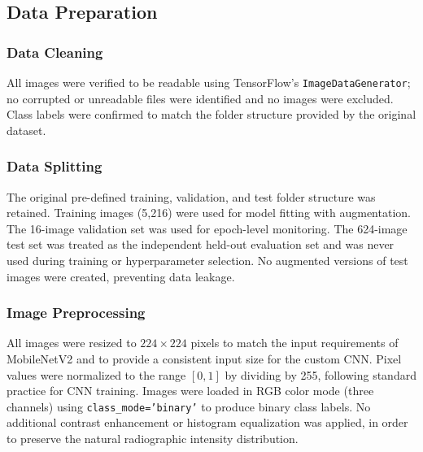 \documentclass[preprint,12pt]{elsarticle}
\begin{document}
\subsection{Data Preparation}

\subsubsection{Data Cleaning}
All images were verified to be readable using TensorFlow's
\texttt{ImageDataGenerator}; no corrupted or unreadable files were
identified and no images were excluded.
Class labels were confirmed to match the folder structure provided by
the original dataset.

\subsubsection{Data Splitting}
The original pre-defined training, validation, and test folder
structure was retained.
Training images (5{,}216) were used for model fitting with
augmentation.
The 16-image validation set was used for epoch-level monitoring.
The 624-image test set was treated as the independent held-out
evaluation set and was never used during training or hyperparameter
selection.
No augmented versions of test images were created, preventing data
leakage.

\subsubsection{Image Preprocessing}
All images were resized to $224 \times 224$ pixels to match the input
requirements of MobileNetV2 and to provide a consistent input size for
the custom CNN.
Pixel values were normalized to the range $[0, 1]$ by dividing by 255,
following standard practice for CNN training.
Images were loaded in RGB color mode (three channels) using
\texttt{class\_mode='binary'} to produce binary class labels.
No additional contrast enhancement or histogram equalization was
applied, in order to preserve the natural radiographic intensity
distribution.
\end{document}
